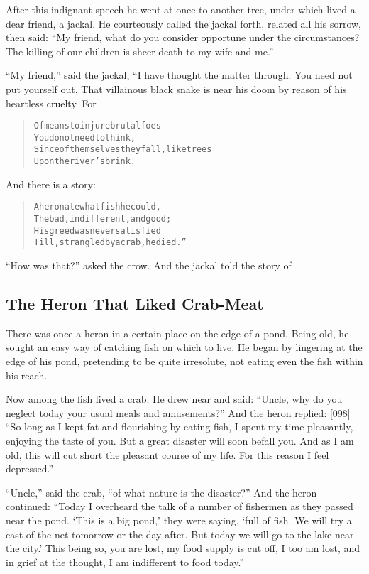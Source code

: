 \documentclass[article, twoside, 14pt]{memoir}
\renewenvironment{verbatim}{%
\begin{quote}%
\vskip -10pt%
\begin{alltt}\normalfont\large}{\end{alltt}%
\end{quote}%
\vskip -10pt
} %
\begin{document}
After this indignant speech he went at once to another tree, under
which lived a dear friend, a jackal. He courteously called the
jackal forth, related all his sorrow, then said:
``My friend, what do you consider opportune under the circumstances? The killing of our children is sheer death to my wife and me.''

``My friend,'' said the jackal, “I have thought the matter through.
You need not put yourself out. That villainous black snake is near
his doom by reason of his heartless cruelty. For

\begin{verbatim}
Of means to injure brutal foes
    You do not need to think,
Since of themselves they fall, like trees
    Upon the river's brink.
\end{verbatim}
And there is a story:

\begin{verbatim}
A heron ate what fish he could,
The bad, indifferent, and good;
His greed was never satisfied
Till, strangled by a crab, he died.”
\end{verbatim}
``How was that?'' asked the crow. And the jackal told the story of

\subsection{The Heron That Liked Crab-Meat}

\label{s9}

There was once a heron in a certain place on the edge of a pond.
Being old, he sought an easy way of catching fish on which to live.
He began by lingering at the edge of his pond, pretending to be
quite irresolute, not eating even the fish within his reach.

Now among the fish lived a crab. He drew near and said:
``Uncle, why do you neglect today your usual meals and amusements?''
And the heron replied: [098]
``So long as I kept fat and flourishing by eating fish, I spent my time pleasantly, enjoying the taste of you. But a great disaster will soon befall you. And as I am old, this will cut short the pleasant course of my life. For this reason I feel depressed.''

``Uncle,'' said the crab, ``of what nature is the disaster?'' And
the heron continued:
``Today I overheard the talk of a number of fishermen as they passed near the pond. `This is a big pond,' they were saying, `full of fish. We will try a cast of the net tomorrow or the day after. But today we will go to the lake near the city.' This being so, you are lost, my food supply is cut off, I too am lost, and in grief at the thought, I am indifferent to food today.''
\end{document}
